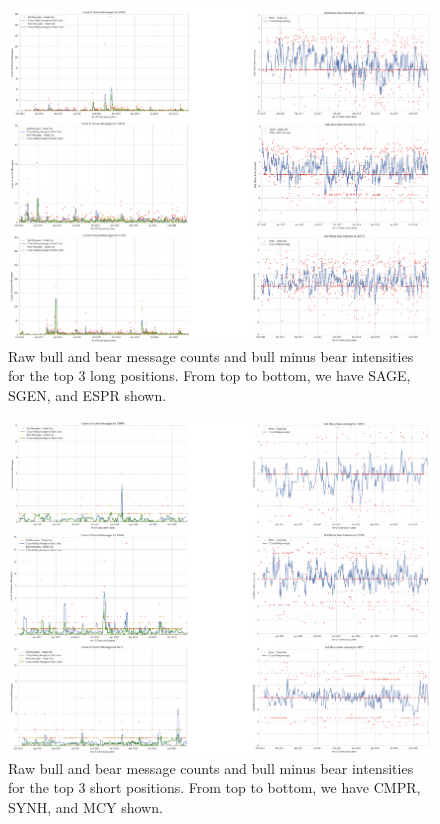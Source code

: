 \documentclass[11,]{article}
\begin{document}
\begin{figure}
\centering
\includegraphics{cahoon_final_paper_files/figure-latex/unnamed-chunk-13-1.pdf}
\caption{\label{topstock}Raw bull and bear message counts and bull minus
bear intensities for the top 3 long positions. From top to bottom, we
have SAGE, SGEN, and ESPR shown.}
\end{figure}

\begin{figure}
\centering
\includegraphics{cahoon_final_paper_files/figure-latex/unnamed-chunk-14-1.pdf}
\caption{\label{botstock}Raw bull and bear message counts and bull minus
bear intensities for the top 3 short positions. From top to bottom, we
have CMPR, SYNH, and MCY shown.}
\end{figure}
\end{document}
